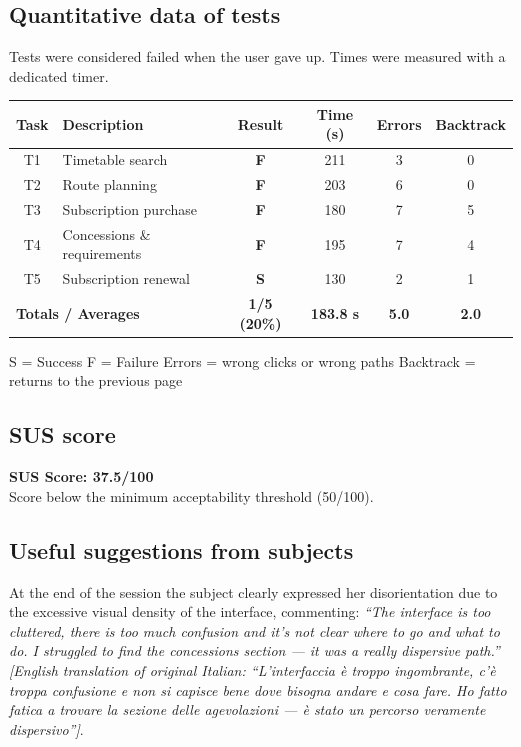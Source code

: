 ﻿\documentclass[11pt,a4paper]{article}
\begin{document}
\subsection*{Quantitative data of tests}
\begin{tcolorbox}[base]
Tests were considered failed when the user gave up.
Times were measured with a dedicated timer.
\begin{center}
\renewcommand{\arraystretch}{1.4}
\begin{tabular}{clcccc}
\toprule
\textbf{Task} & \textbf{Description} &
\textbf{Result} & \textbf{Time (s)} &
\textbf{Errors} & \textbf{Backtrack} \\
\midrule
T1 & Timetable search         & \textbf{F} & 211 & 3 & 0 \\
T2 & Route planning           & \textbf{F} & 203 & 6 & 0 \\
T3 & Subscription purchase    & \textbf{F} & 180 & 7 & 5 \\
T4 & Concessions \& requirements & \textbf{F} & 195 & 7 & 4 \\
T5 & Subscription renewal     & \textbf{S} & 130 & 2 & 1 \\
\midrule
\multicolumn{2}{l}{\textbf{Totals / Averages}} &
\textbf{1/5 (20\%)} & \textbf{183.8 s} &
\textbf{5.0} & \textbf{2.0} \\
\bottomrule
\end{tabular}
\end{center}

\vspace{0.3cm}
\small S = Success \quad F = Failure \quad
Errors = wrong clicks or wrong paths \quad
Backtrack = returns to the previous page
\end{tcolorbox}

\subsection*{SUS score}
\begin{tcolorbox}[base]
\textbf{SUS Score: 37.5/100}\\[0.2cm]
\small Score below the minimum acceptability threshold
(50/100).
\end{tcolorbox}

\subsection*{Useful suggestions from subjects}
\begin{tcolorbox}[base]
At the end of the session the subject clearly expressed her disorientation due to the excessive visual density of the interface, commenting:
\textit{``The interface is too cluttered, there is too much confusion and it's not clear where to go and what to do. I struggled to find the concessions section --- it was a really dispersive path.'' [English translation of original Italian: ``L'interfaccia \`e troppo ingombrante, c'\`e troppa confusione e non si capisce bene dove bisogna andare e cosa fare. Ho fatto fatica a trovare la sezione delle agevolazioni --- \`e stato un percorso veramente dispersivo'']}.
\end{tcolorbox}
\end{document}
